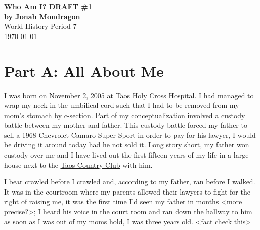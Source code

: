 \documentclass[12pt]{article}
\begin{document}
\doublespacing

\begin{titlepage}
    \begin{center}
        \vspace*{1.5in}
        {\huge\bfseries{Who Am I? DRAFT \#1}}\\
            {\bfseries{by Jonah Mondragon}}\\
            World History Period 7\\
            \today
    \end{center}
\end{titlepage}

\section*{Part A: All About Me}

I was born on November 2, 2005 at Taos Holy Cross Hospital.
I had managed to wrap my neck in the umbilical cord such that I had to be removed from my mom's stomach by c-section.
Part of my conceptualization involved a custody battle between my mother and father.
This custody battle forced my father to sell a 1968 Chevrolet Camaro Super Sport in order to pay for his lawyer, I would be driving it around today had he not sold it.
Long story short, my father won custody over me and I have lived out the first fifteen years of my life in a large house next to the {\color{blue}\underline{\href{https://www.taoscountryclub.com/}{Taos Country Club}}} with him.

I bear crawled before I crawled and, according to my father, ran before I walked.
It was in the courtroom where my parents allowed their lawyers to fight for the right of raising me, it was the first time I'd seen my father in months <more precise?>; I heard his voice in the court room and ran down the hallway to him as soon as I was out of my moms hold, I was three years old. <fact check this>
\end{document}
